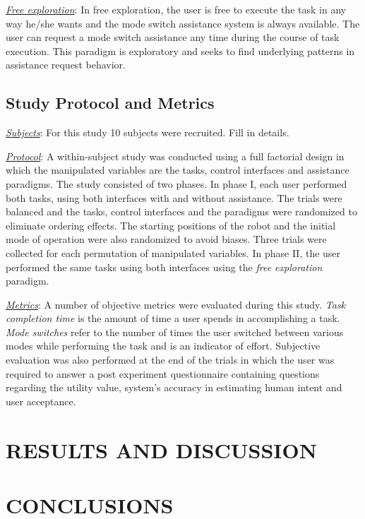 \documentclass[conference]{IEEEtran}
\begin{document}
\noindent\underline{\textit{Free exploration}}: In free exploration, the user is free to execute the task in any way he/she wants and the mode switch assistance system is always available. The user can request a mode switch assistance any time during the course of task execution. This paradigm is exploratory and seeks to find underlying patterns in assistance request behavior. 
\subsection{Study Protocol and Metrics}
\noindent\underline{\textit{Subjects}}: For this study 10 subjects were recruited. Fill in details. 

\noindent\underline{\textit{Protocol}}:
A within-subject study was conducted using a full factorial design in which the manipulated variables are the tasks, control interfaces and assistance paradigms. The study consisted of two phases. In phase I, each user performed both tasks, using both interfaces with and without assistance. The trials were balanced and the tasks, control interfaces and the paradigms were randomized to eliminate ordering effects. The starting positions of the robot and the initial mode of operation were also randomized to avoid biases. Three trials were collected for each permutation of manipulated variables.  
In phase II, the user performed the same tasks using both interfaces using the \textit{free exploration} paradigm. 

\noindent\underline{\textit{Metrics}}: A number of objective metrics were evaluated during this study. \textit{Task completion time} is the amount of time a user spends in accomplishing a task. \textit{Mode switches} refer to the number of times the user switched between various modes while performing the task and is an indicator of effort. Subjective evaluation was also performed at the end of the trials in which the user was required to answer a post experiment questionnaire containing questions regarding the utility value, system's accuracy in estimating human intent and user acceptance. 

\section{RESULTS AND DISCUSSION} \label{RES}
\section{CONCLUSIONS}\label{CON}
\end{document}
